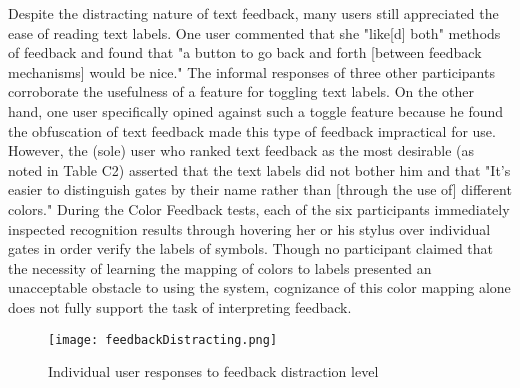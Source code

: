 \documentclass{egpubl}
\begin{document}

Despite the distracting nature of text feedback, many users still
appreciated the ease of reading text labels.  One user commented that
she "like[d] both" methods of feedback and found that "a button to go
back and forth [between feedback mechanisms] would be nice."  The
informal responses of three other participants corroborate the
usefulness of a feature for toggling text labels.  On the other hand,
one user specifically opined against such a toggle feature because he
found the obfuscation of text feedback made this type of feedback
impractical for use.  However, the (sole) user who ranked text
feedback as the most desirable (as noted in Table C2) asserted that
the text labels did not bother him and that "It's easier to
distinguish gates by their name rather than [through the use of]
different colors."  During the Color Feedback tests, each of the six
participants immediately inspected recognition results through
hovering her or his stylus over individual gates in order verify the
labels of symbols.  Though no participant claimed that the necessity
of learning the mapping of colors to labels presented an unacceptable
obstacle to using the system, cognizance of this color mapping alone
does not fully support the task of interpreting feedback.

\begin{figure}[tb]
  \centering
  \texttt{[image: feedbackDistracting.png]}
  \caption{\label{fig:feedbackDistracting}
           Individual user responses to feedback distraction level}
\end{figure}
\end{document}
